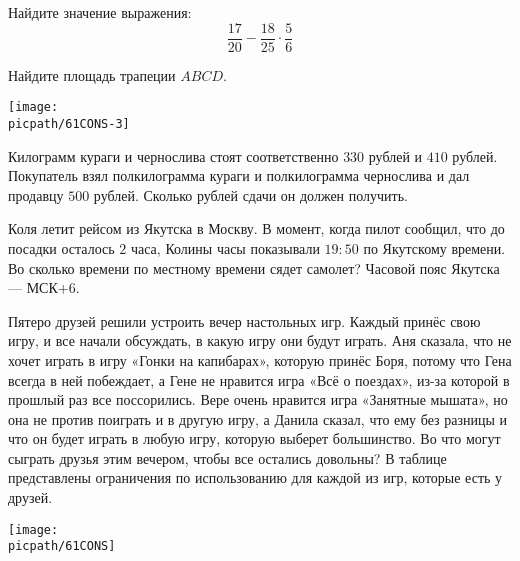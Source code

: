 \begin{consultation}
	\begin{listofex}
		\item Найдите значение выражения: \[ \dfrac{17}{20} - \dfrac{18}{25} \cdot \dfrac{5}{6} \]
		\item
		\begin{minipage}[t]{180pt}
			Найдите площадь трапеции \( ABCD \).
		\end{minipage}
		\hspace{0.01\linewidth}
		\begin{minipage}[t]{100pt}
			\texttt{[image: \\picpath/61CONS-3]}
		\end{minipage}
		
		\item Килограмм кураги и чернослива стоят соответственно \(330\) рублей и \(410\) рублей. Покупатель взял полкилограмма кураги и полкилограмма чернослива и дал продавцу \(500\) рублей. Сколько рублей сдачи он должен получить.
		\item Коля летит рейсом из Якутска в Москву. В момент, когда пилот сообщил, что до посадки осталось \(2\) часа, Колины часы показывали \(19:50\) по Якутскому времени. Во сколько времени по местному времени сядет самолет? Часовой пояс Якутска --- МСК\(+6\).
		\item
		\begin{minipage}[t]{160pt}
		Пятеро друзей решили устроить вечер настольных игр. Каждый принёс свою игру, и все начали обсуждать, в какую игру они будут играть. Аня сказала, что не хочет играть в игру «Гонки на капибарах», которую принёс Боря, потому что Гена всегда в ней побеждает, а Гене не нравится игра «Всё о поездах», из-за которой в прошлый раз все поссорились. Вере очень нравится игра «Занятные мышата», но она не против поиграть и в другую игру, а Данила сказал, что ему без разницы и что он будет играть в любую игру, которую выберет большинство. Во что могут сыграть друзья этим вечером, чтобы все остались довольны? В таблице представлены ограничения по использованию для каждой из игр, которые есть у друзей.
		\end{minipage}
		\hspace{0.01\linewidth}
		\begin{minipage}[t]{140pt}
			\texttt{[image: \\picpath/61CONS]}
		\end{minipage}
		

\end{listofex}
\end{consultation}
